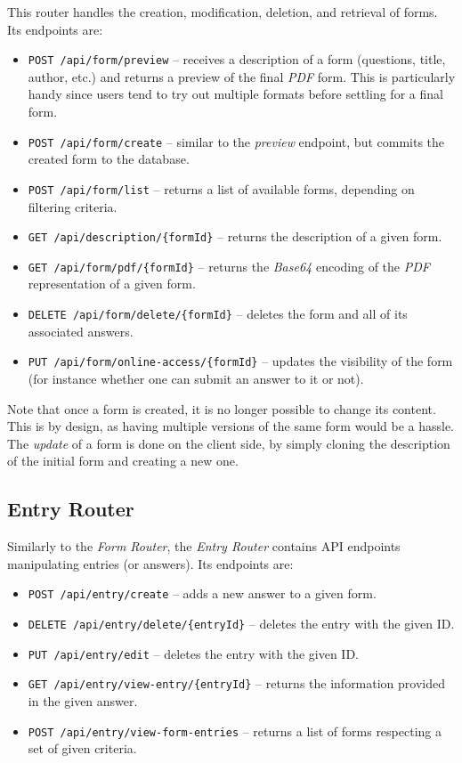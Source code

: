 \documentclass[11pt, a4paper]{report}
\def\code#1{\texttt{#1}}
\begin{document}
This router handles the creation, modification, deletion, and retrieval of forms. Its endpoints are:
\begin{itemize}
    \item \code{POST /api/form/preview} -- receives a description of a form (questions, title, author, etc.) and returns a preview of the final \textit{PDF} form. This is particularly handy since users tend to try out multiple formats before settling for a final form.
    \item \code{POST /api/form/create} -- similar to the \textit{preview} endpoint, but commits the created form to the database.
    \item \code{POST /api/form/list} -- returns a list of available forms, depending on filtering criteria.
    \item \code{GET /api/description/\{formId\}} -- returns the description of a given form.
    \item \code{GET /api/form/pdf/\{formId\}} -- returns the \textit{Base64} encoding of the \textit{PDF} representation of a given form.
    \item \code{DELETE /api/form/delete/\{formId\}} -- deletes the form and all of its associated answers.
    \item \code{PUT /api/form/online-access/\{formId\}} -- updates the visibility of the form (for instance whether one can submit an answer to it or not).
\end{itemize}

Note that once a form is created, it is no longer possible to change its content. This is by design, as having multiple versions of the same form would be a hassle. The \textit{update} of a form is done on the client side, by simply cloning the description of the initial form and creating a new one.

\subsection{Entry Router}

Similarly to the \textit{Form Router}, the \textit{Entry Router} contains API endpoints manipulating entries (or answers). Its endpoints are:
\begin{itemize}
    \item \code{POST /api/entry/create} -- adds a new answer to a given form.
    \item \code{DELETE /api/entry/delete/\{entryId\}} -- deletes the entry with the given ID.
    \item \code{PUT /api/entry/edit} -- deletes the entry with the given ID.
    \item \code{GET /api/entry/view-entry/\{entryId\}} -- returns the information provided in the given answer.
    \item \code{POST /api/entry/view-form-entries} -- returns a list of forms respecting a set of given criteria.
\end{itemize}
\end{document}
